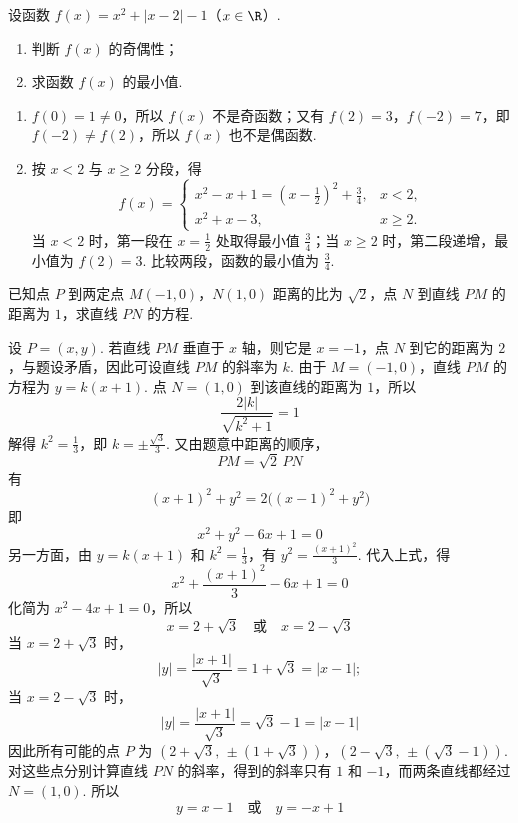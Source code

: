 \begin{problem}
设函数 \(f(x) = x^2 + |x - 2| - 1\)（\(x \in \R\)）.
\begin{enumerate}
\item 判断 \(f(x)\) 的奇偶性；
\item 求函数 \(f(x)\) 的最小值.
\end{enumerate}
\end{problem}

\begin{solution}
\begin{enumerate}
\item \(f(0)=1\neq0\)，所以 \(f(x)\) 不是奇函数；又有 \(f(2)=3\)，\(f(-2)=7\)，即 \(f(-2)\neq f(2)\)，所以 \(f(x)\) 也不是偶函数.
\item 按 \(x<2\) 与 \(x\geqslant2\) 分段，得
\[
f(x)=
\begin{cases}
x^{2}-x+1=\left(x-\frac12\right)^{2}+\frac34,&x<2,\\
x^{2}+x-3,&x\geqslant2.
\end{cases}
\]
当 \(x<2\) 时，第一段在 \(x=\frac12\) 处取得最小值 \(\frac34\)；当 \(x\geqslant2\) 时，第二段递增，最小值为 \(f(2)=3\). 比较两段，函数的最小值为 \(\frac34\).
\end{enumerate}
\end{solution}

\begin{problem}
已知点 \(P\) 到两定点 \(M(-1,0)\)，\(N(1,0)\) 距离的比为 \(\sqrt{2}\)，点 \(N\) 到直线 \(PM\) 的距离为 \(1\)，求直线 \(PN\) 的方程.
\end{problem}

\begin{solution}
设 \(P=(x,y)\). 若直线 \(PM\) 垂直于 \(x\) 轴，则它是 \(x=-1\)，点 \(N\) 到它的距离为 \(2\)，与题设矛盾，因此可设直线 \(PM\) 的斜率为 \(k\). 由于 \(M=(-1,0)\)，直线 \(PM\) 的方程为 \(y=k(x+1)\). 点 \(N=(1,0)\) 到该直线的距离为 \(1\)，所以
\[
\frac{2|k|}{\sqrt{k^{2}+1}}=1
\]
解得 \(k^{2}=\frac13\)，即 \(k=\pm\frac{\sqrt3}{3}\). 又由题意中距离的顺序，
\[
PM=\sqrt2\,PN
\]
有
\[
(x+1)^{2}+y^{2}=2\bigl((x-1)^{2}+y^{2}\bigr)
\]
即
\[
x^{2}+y^{2}-6x+1=0
\]
另一方面，由 \(y=k(x+1)\) 和 \(k^{2}=\frac13\)，有 \(y^{2}=\frac{(x+1)^{2}}{3}\). 代入上式，得
\[
x^{2}+\frac{(x+1)^{2}}{3}-6x+1=0
\]
化简为 \(x^{2}-4x+1=0\)，所以
\[
x=2+\sqrt3\quad\text{或}\quad x=2-\sqrt3
\]
当 \(x=2+\sqrt3\) 时，
\[
|y|=\frac{|x+1|}{\sqrt3}=1+\sqrt3=|x-1|;
\]
当 \(x=2-\sqrt3\) 时，
\[
|y|=\frac{|x+1|}{\sqrt3}=\sqrt3-1=|x-1|
\]
因此所有可能的点 \(P\) 为
\(\left(2+\sqrt3,\,\pm(1+\sqrt3)\right)\)，\(\left(2-\sqrt3,\,\pm(\sqrt3-1)\right)\).
对这些点分别计算直线 \(PN\) 的斜率，得到的斜率只有 \(1\) 和 \(-1\)，而两条直线都经过 \(N=(1,0)\). 所以
\[
\boxed{y=x-1\quad\text{或}\quad y=-x+1}
\]
\end{solution}

